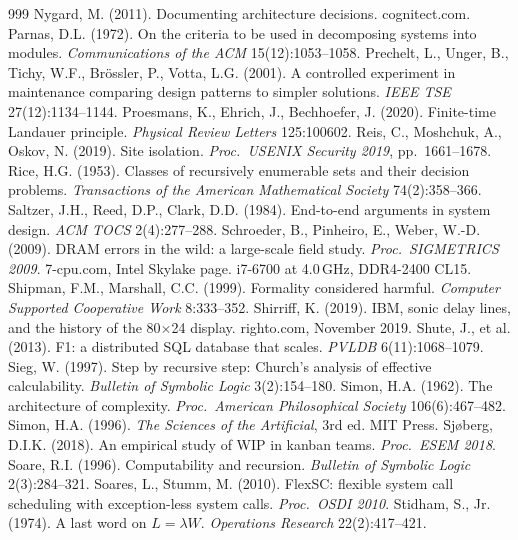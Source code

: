 \documentclass[11pt,oneside]{article}
\theoremstyle{definition}
\theoremstyle{remark}
\begin{document}
\begin{thebibliography}{999}
 Nygard, M. (2011). Documenting architecture decisions. cognitect.com.
 Parnas, D.L. (1972). On the criteria to be used in decomposing systems into modules. \emph{Communications of the ACM} 15(12):1053--1058.
 Prechelt, L., Unger, B., Tichy, W.F., Br\"ossler, P., Votta, L.G. (2001). A controlled experiment in maintenance comparing design patterns to simpler solutions. \emph{IEEE TSE} 27(12):1134--1144.
 Proesmans, K., Ehrich, J., Bechhoefer, J. (2020). Finite-time Landauer principle. \emph{Physical Review Letters} 125:100602.
 Reis, C., Moshchuk, A., Oskov, N. (2019). Site isolation. \emph{Proc.\ USENIX Security 2019}, pp.~1661--1678.
 Rice, H.G. (1953). Classes of recursively enumerable sets and their decision problems. \emph{Transactions of the American Mathematical Society} 74(2):358--366.
 Saltzer, J.H., Reed, D.P., Clark, D.D. (1984). End-to-end arguments in system design. \emph{ACM TOCS} 2(4):277--288.
 Schroeder, B., Pinheiro, E., Weber, W.-D. (2009). DRAM errors in the wild: a large-scale field study. \emph{Proc.\ SIGMETRICS 2009}.
 7-cpu.com, Intel Skylake page. i7-6700 at 4.0\,GHz, DDR4-2400 CL15.
 Shipman, F.M., Marshall, C.C. (1999). Formality considered harmful. \emph{Computer Supported Cooperative Work} 8:333--352.
 Shirriff, K. (2019). IBM, sonic delay lines, and the history of the 80$\times$24 display. righto.com, November 2019.
 Shute, J., et al. (2013). F1: a distributed SQL database that scales. \emph{PVLDB} 6(11):1068--1079.
 Sieg, W. (1997). Step by recursive step: Church's analysis of effective calculability. \emph{Bulletin of Symbolic Logic} 3(2):154--180.
 Simon, H.A. (1962). The architecture of complexity. \emph{Proc.\ American Philosophical Society} 106(6):467--482.
 Simon, H.A. (1996). \emph{The Sciences of the Artificial}, 3rd ed. MIT Press.
 Sj\o berg, D.I.K. (2018). An empirical study of WIP in kanban teams. \emph{Proc.\ ESEM 2018}.
 Soare, R.I. (1996). Computability and recursion. \emph{Bulletin of Symbolic Logic} 2(3):284--321.
 Soares, L., Stumm, M. (2010). FlexSC: flexible system call scheduling with exception-less system calls. \emph{Proc.\ OSDI 2010}.
 Stidham, S., Jr. (1974). A last word on $L=\lambda W$. \emph{Operations Research} 22(2):417--421.

\end{thebibliography}
\end{document}
